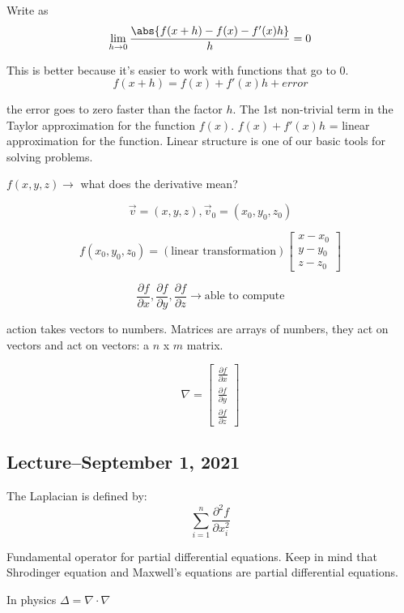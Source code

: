 \documentclass{scrreprt}
\begin{document}
Write as \[
	\lim_{h \rightarrow 0}\frac{\abs{f(x+h)-f(x)-f'(x)h}}{h} = 0
\]

This is better because it's easier to work with functions that go to $0$.
\[
	f(x+h)=f(x)+f'(x)h+ error
\]

the error goes to zero faster than the factor $h$. The 1st non-trivial term
in the Taylor approximation for the function $f(x)$. $f(x)+f'(x)h$ = linear
approximation for the function. Linear structure is one of our basic tools
for solving problems.

$f(x, y, z)\rightarrow$ what does the derivative mean?

\[
	\vec{v}= (x, y, z), \vec{v}_0=(x_0, y_0, z_0)
\]

\[
	f(x_0, y_0, z_0) = (\text{linear transformation})\begin{bmatrix}
		x - x_0 \\
		y - y_0 \\
		z - z_0
	\end{bmatrix}
\]

\[
	\frac{\partial f}{\partial x}, \frac{\partial f}{\partial y}, \frac{\partial f}{\partial z}\rightarrow \text{able to compute}
\]

action takes vectors to numbers. Matrices are arrays of numbers, they act on vectors
and act on vectors: a $n$ x $m$ matrix.

\begin{definition}[Gradient]
	\[
		\nabla = \begin{bmatrix}
			\frac{\partial f}{\partial x} \\
			\frac{\partial f}{\partial y} \\
			\frac{\partial f}{\partial z}
		\end{bmatrix}
	\]
\end{definition}

\subsection{Lecture--September 1, 2021}

\begin{definition}[Laplacian]
	The Laplacian is defined by:
	\[
		\sum_{i=1}^n \frac{\partial^2 f}{\partial x_i^2}
	\]

	Fundamental operator for partial differential equations. Keep in mind that
	Shrodinger equation and Maxwell's equations are partial differential equations.

	In physics $\Delta = \nabla\cdot \nabla$
\end{definition}
\end{document}
